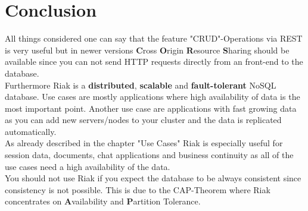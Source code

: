 \section{Conclusion}
All things considered one can say that the feature "CRUD"-Operations via REST is very useful but in newer versions \textbf{C}ross \textbf{O}rigin \textbf{R}esource \textbf{S}haring should be available since you can not send HTTP requests directly from an front-end to the database. 
\\
Furthermore Riak is a \textbf{distributed}, \textbf{scalable} and \textbf{fault-tolerant} NoSQL database. Use cases are mostly applications where high availability of data is the most important point. Another use case are applications with fast growing data as you can add new servers/nodes to your cluster and the data is replicated automatically. \cite{Basho.06.04.2017} 
\\
As already described in the chapter "Use Cases" Riak is especially useful for session data, documents, chat applications and business continuity as all of the use cases need a high availability of the data. \cite{Basho.06.04.2017}
\\
You should not use Riak if you expect the database to be always consistent since consistency is not possible. This is due to the CAP-Theorem where Riak concentrates on \textbf{A}vailability and \textbf{P}artition Tolerance.	